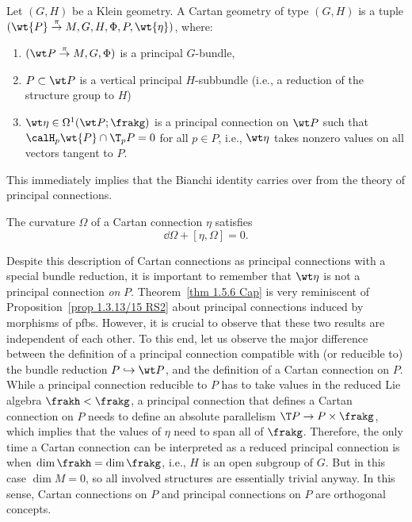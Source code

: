 \begin{defn}\label{def cartan geometry II}
    Let $(G,H)$ be a Klein geometry. A Cartan geometry of type $(G,H)$ is a tuple $(\wt{P}\overset{\pi}{\to}M,G,H,\Phi,P,\wt{\eta})$, where:
    \begin{enumerate}
        \item $(\wt P\overset{\pi}{\to}M,G,\Phi)$ is a principal $G$-bundle,
        \item $P\subset \wt P$ is a vertical principal $H$-subbundle (i.e., a reduction of the structure group to $H$)
        \item $\wt\eta\in\Omega^1(\wt P;\frakg)$ is a principal connection on $\wt P$ such that $\calH_p \wt{P}\cap \T_pP=0$ for all $p\in P$, i.e., $\wt\eta$ takes nonzero values on all vectors tangent to $P$.
    \end{enumerate}
\end{defn}

This immediately implies that the Bianchi identity carries over from the theory of principal connections.

\begin{cor}
    The curvature $\Omega$ of a Cartan connection $\eta$ satisfies 
    \[\dd \Omega+[\eta,\Omega]=0.\]
\end{cor}

\begin{rem}
    Despite this description of Cartan connections as principal connections with a special bundle reduction, it is important to remember that $\wt\eta$ is not a principal connection \emph{on} $P$. Theorem~\ref{thm 1.5.6 Cap} is very reminiscent of Proposition~\ref{prop 1.3.13/15 RS2} about principal connections induced by morphisms of \glspl{pfb}. However, it is crucial to observe that these two results are independent of each other. To this end, let us observe the major difference between the definition of a principal connection compatible with (or reducible to) the bundle reduction $P\hookrightarrow \wt P$, and the definition of a Cartan connection on $P$. While a principal connection reducible to $P$ has to take values in the reduced Lie algebra $\frakh<\frakg$, a principal connection that defines a Cartan connection on $P$ needs to define an absolute parallelism $\T P\to P\times\frakg$, which implies that the values of $\eta$ need to span all of $\frakg$. Therefore, the only time a Cartan connection can be interpreted as a reduced principal connection is when $\dim\frakh=\dim\frakg$, i.e., $H$ is an open subgroup of $G$. But in this case $\dim M=0$, so all involved structures are essentially trivial anyway. In this sense, Cartan connections on $P$ and principal connections on $P$ are orthogonal concepts.
\end{rem}






